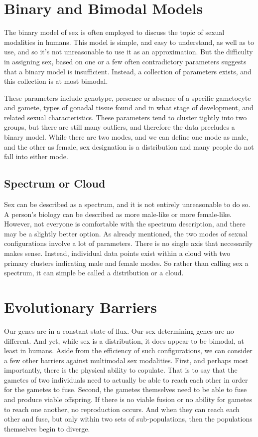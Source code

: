 \documentclass{article}
\begin{document}
\section{Binary and Bimodal Models}
The binary model of sex is often employed to discuss the topic of sexual modalities in humans. This model is simple, and easy to understand, as well as to use, and so it's not unreasonable to use it as an approximation. But the difficulty in assigning sex, based on one or a few often contradictory parameters suggests that a binary model is insufficient\cite{Legato2018}. Instead, a collection of parameters exists, and this collection is at most bimodal.

These parameters include genotype, presence or absence of a specific gametocyte and gamete, types of gonadal tissue found and in what stage of development, and related sexual characteristics. These parameters tend to cluster tightly into two groups, but there are still many outliers, and therefore the data precludes a binary model. While there are two modes, and we can define one mode as male, and the other as female, sex designation is a distribution and many people do not fall into either mode.
\subsection{Spectrum or Cloud}
Sex can be described as a spectrum, and it is not entirely unreasonable to do so. A person's biology can be described as more male-like or more female-like. However, not everyone is comfortable with the spectrum description, and there may be a slightly better option. As already mentioned, the two modes of sexual configurations involve a lot of parameters. There is no single axis that necessarily makes sense. Instead, individual data points exist within a cloud with two primary clusters indicating male and female modes. So rather than calling sex a spectrum, it can simple be called a distribution or a cloud. 
\section{Evolutionary Barriers}
Our genes are in a constant state of ﬂux. Our sex determining genes are no diﬀerent. And yet, while sex is a distribution, it does appear to be bimodal, at least in humans. Aside from the eﬃciency of such conﬁgurations, we can consider a few other barriers against multimodal sex modalities. First, and perhaps most importantly, there is the physical ability to copulate. That is to say that the gametes of two individuals need to actually be able to reach each other in order for the gametes to fuse. Second, the gametes themselves need to be able to fuse and produce viable oﬀspring. If there is no viable fusion or no ability for gametes to reach one another, no reproduction occurs. And when they can reach each other and fuse, but only within two sets of sub-populations, then the populations themselves begin to diverge.
\end{document}
